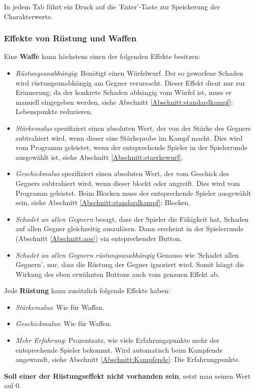 \documentclass[11pt, a4paper, german]{article}
\begin{document}
In jedem Tab führt ein Druck auf die 'Enter'-Taste zur Speicherung der Charakterwerte.


\subsubsection{Effekte von Rüstung und Waffen} \label{Abschnitt: Effekte}
Eine \textbf{Waffe} kann höchstens einen der folgenden Effekte besitzen:
\begin{itemize}
\item[] \textit{Rüstungsunabhängig}: Benötigt einen Würfelwurf. Der so geworfene Schaden wird rüstungsunabhängig am Gegner verursacht. Dieser Effekt dient nur zur Erinnerung; da der konkrete Schaden abhängig vom Würfel ist, muss er manuell eingegeben werden, siehe Abschnitt \ref{Abschnitt:standardkampf}: Lebenspunkte reduzieren.
\item[] \textit{Stärkemalus} spezifiziert einen absoluten Wert, der von der Stärke des Gegners subtrahiert wird, wenn dieser eine Stärkeprobe im Kampf macht. Dies wird vom Programm geleistet, wenn der entsprechende Spieler in der Spielerrunde ausgewählt ist, siehe Abschnitt \ref{Abschnitt:staerkewurf}.
\item[] \textit{Geschickmalus} spezifiziert einen absoluten Wert, der vom Geschick des Gegners subtrahiert wird, wenn dieser blockt oder angreift. Dies wird vom Programm geleistet. Beim Blocken muss der entsprechende Spieler ausgewählt sein, siehe Abschnitt \ref{Abschnitt:standardkampf}: Blocken.
\item[] \textit{Schadet an allen Gegnern} besagt, dass der Spieler die Fähigkeit hat, Schaden auf allen Gegner gleichzeitig auszulösen. Dann erscheint in der Spielerrunde (Abschnitt \ref{Abschnitt:aoe}) ein entsprechender Button.
\item[] \textit{Schadet an allen Gegnern rüstungsunabhängig} Genauso wie 'Schadet allen Gegnern', nur, dass die Rüstung der Gegner ignoriert wird. Somit hängt die Wirkung des eben erwähnten Buttons auch vom genauen Effekt ab.
\end{itemize}
Jede \textbf{Rüstung} kann zusätzlich folgende Effekte haben:
\begin{itemize}
\item[] \textit{Stärkemalus}: Wie für Waffen.
\item[] \textit{Geschickmalus}: Wie für Waffen.
\item[] \textit{Mehr Erfahrung}: Prozentsatz, wie viele Erfahrungspunkte mehr der entsprechende Spieler bekommt. Wird automatisch beim Kampfende angewandt, siehe Abschnitt \ref{Abschnitt:Kampfende}: Die Erfahrungpunkte.
\end{itemize}
\textbf{Soll einer der Rüstungseffekt nicht vorhanden sein}, setzt man seinen Wert auf 0.
\end{document}
